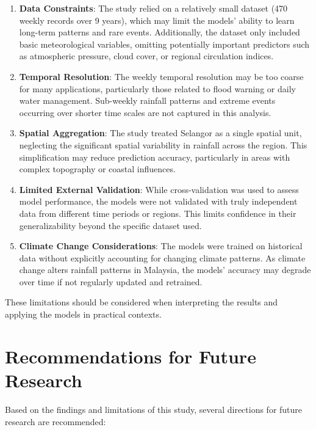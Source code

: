 \documentclass[12pt]{article}
\begin{document}
\begin{enumerate}
    \item \textbf{Data Constraints}: The study relied on a relatively small dataset (470 weekly records over 9 years), which may limit the models' ability to learn long-term patterns and rare events. Additionally, the dataset only included basic meteorological variables, omitting potentially important predictors such as atmospheric pressure, cloud cover, or regional circulation indices.
    
    \item \textbf{Temporal Resolution}: The weekly temporal resolution may be too coarse for many applications, particularly those related to flood warning or daily water management. Sub-weekly rainfall patterns and extreme events occurring over shorter time scales are not captured in this analysis.
    
    \item \textbf{Spatial Aggregation}: The study treated Selangor as a single spatial unit, neglecting the significant spatial variability in rainfall across the region. This simplification may reduce prediction accuracy, particularly in areas with complex topography or coastal influences.
    
    \item \textbf{Limited External Validation}: While cross-validation was used to assess model performance, the models were not validated with truly independent data from different time periods or regions. This limits confidence in their generalizability beyond the specific dataset used.
    
    \item \textbf{Climate Change Considerations}: The models were trained on historical data without explicitly accounting for changing climate patterns. As climate change alters rainfall patterns in Malaysia, the models' accuracy may degrade over time if not regularly updated and retrained.
\end{enumerate}

These limitations should be considered when interpreting the results and applying the models in practical contexts.

\section{Recommendations for Future Research}
\label{sec:future_research}

Based on the findings and limitations of this study, several directions for future research are recommended:
\end{document}
